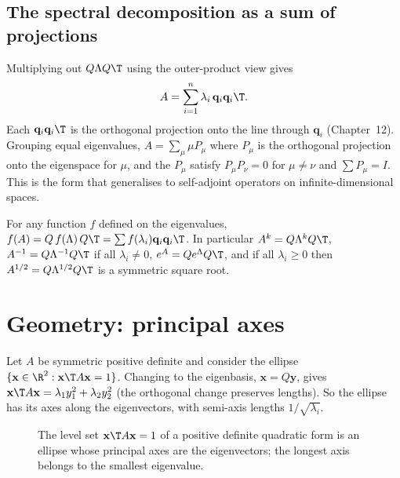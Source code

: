 \subsection*{The spectral decomposition as a sum of projections}

Multiplying out $Q\Lambda Q\T$ using the outer-product view gives
\[ A=\sum_{i=1}^n\lambda_i\,\mathbf{q}_i\mathbf{q}_i\T. \]
Each $\mathbf{q}_i\mathbf{q}_i\T$ is the orthogonal projection onto the line through $\mathbf{q}_i$ (Chapter~12). Grouping equal eigenvalues, $A=\sum_\mu\mu P_\mu$ where $P_\mu$ is the orthogonal projection onto the eigenspace for $\mu$, and the $P_\mu$ satisfy $P_\mu P_\nu=0$ for $\mu\ne\nu$ and $\sum P_\mu=I$. This is the form that generalises to self-adjoint operators on infinite-dimensional spaces.

\begin{corollary}\label{cor:symfunc}
For any function $f$ defined on the eigenvalues, $f(A)=Q\,f(\Lambda)\,Q\T=\sum f(\lambda_i)\mathbf{q}_i\mathbf{q}_i\T$. In particular $A^k=Q\Lambda^kQ\T$, $A^{-1}=Q\Lambda^{-1}Q\T$ if all $\lambda_i\ne0$, $e^A=Qe^\Lambda Q\T$, and if all $\lambda_i\ge0$ then $A^{1/2}=Q\Lambda^{1/2}Q\T$ is a symmetric square root.
\end{corollary}

\section{Geometry: principal axes}

Let $A$ be symmetric positive definite and consider the ellipse $\{\mathbf{x}\in\R^2:\mathbf{x}\T A\mathbf{x}=1\}$. Changing to the eigenbasis, $\mathbf{x}=Q\mathbf{y}$, gives $\mathbf{x}\T A\mathbf{x}=\lambda_1y_1^2+\lambda_2y_2^2$ (the orthogonal change preserves lengths). So the ellipse has its axes along the eigenvectors, with semi-axis lengths $1/\sqrt{\lambda_i}$.

\begin{figure}[h]
\centering
{}
\caption{The level set $\mathbf{x}\T A\mathbf{x}=1$ of a positive definite quadratic form is an ellipse whose principal axes are the eigenvectors; the longest axis belongs to the smallest eigenvalue.}
\end{figure}

